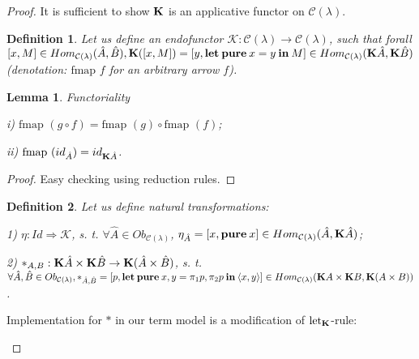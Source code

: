 \documentclass[a4paper]{article}
\newtheorem{lemma}{Lemma}
\newtheorem{defin}{Definition}
\begin{document}
\begin{proof}
It is sufficient to show ${\bf K}$ is an applicative functor on $\mathcal{C}(\lambda)$.

\begin{defin}
  Let us define an endofunctor $\mathcal{K} : \mathcal{C}(\lambda) \to \mathcal{C}(\lambda)$, such that
forall $[x,M] \in Hom_{\mathcal{C}(\lambda)}(\hat{A},\hat{B}), {\bf K}([x,M]) = [y, {\bf let \: pure \:} x = y {\: \bf in \:} M] \in Hom_{\mathcal{C}(\lambda)}({\bf K} \hat{A}, {\bf K} \hat{B})$ (denotation: $\text{fmap } f$ for an arbitrary arrow $f$).

\end{defin}

\begin{lemma} Functoriality

  i) $\text{fmap }(g \circ f) = \text{fmap }(g) \circ \text{fmap }(f)$;

  ii) $\text{fmap }(id_{\hat{A}}) = id_{{\bf K}\hat{A}}$.
\end{lemma}

\begin{proof}

Easy checking using reduction rules.

\end{proof}

\begin{defin}

  Let us define natural transformations:

  1) $\eta:Id \Rightarrow \mathcal{K}$, s. t. $\forall \hat{A} \in Ob_{\mathcal{C}(\lambda)}$, $\eta_{\hat{A}} = [x, {\bf pure \:} x] \in Hom_{\mathcal{C}(\lambda)}(\hat{A}, {\bf K}\hat{A})$;

  2) $\ast_{A,B}:{\bf K}\hat{A} \times {\bf K}\hat{B} \to {\bf K}(\hat{A} \times \hat{B})$, s. t. $\forall \hat{A}, \hat{B} \in Ob_{\mathcal{C}(\lambda)}, \ast_{\hat{A},\hat{B}} = [p, {\bf let \: pure \:} x,y = \pi_1 p, \pi_2 p {\: \bf in \:} \langle x, y \rangle] \in Hom_{\mathcal{C}(\lambda)}({\bf K}A \times {\bf K}B, {\bf K}(A \times B))$.
\end{defin}

Implementation for $\ast$ in our term model is a modification of ${\text{let}_{\bf K}}$-rule:

\begin{prooftree}
\end{prooftree}


\end{proof}
\end{document}
